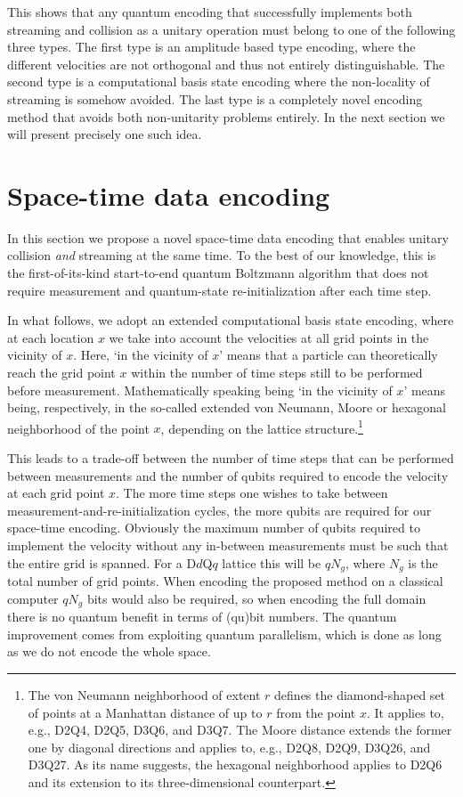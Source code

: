 This shows that any quantum encoding that successfully implements both streaming and collision as a unitary operation must belong to one of the following three types. The first type is an amplitude based type encoding, where the different velocities are not orthogonal and thus not entirely distinguishable. The second type is a computational basis state encoding where the non-locality of streaming is somehow avoided. The last type is a completely novel encoding method that avoids both non-unitarity problems entirely.
In the next section we will present precisely one such idea.


\section{Space-time data encoding}\label{sec:novel_encoding}
In this section we propose a novel space-time data encoding that enables unitary collision \emph{and} streaming at the same time. To the best of our knowledge, this is the first-of-its-kind start-to-end quantum Boltzmann algorithm that does not require measurement and quantum-state re-initialization after each time step.

In what follows, we adopt an extended computational basis state encoding, where at each location $x$ we take into account the velocities at all grid points in the vicinity of $x$. Here, `in the vicinity of $x$' means that a particle can theoretically reach the grid point $x$ within the number of time steps still to be performed before measurement. Mathematically speaking being `in the vicinity of $x$' means being, respectively, in the so-called extended von Neumann, Moore or hexagonal neighborhood of the point $x$, depending on the lattice structure.\footnote{The von Neumann neighborhood of extent $r$ defines the diamond-shaped set of points at a Manhattan distance of up to $r$ from the point $x$. It applies to, e.g., D2Q4, D2Q5, D3Q6, and D3Q7. The Moore distance extends the former one by diagonal directions and applies to, e.g., D2Q8, D2Q9, D3Q26, and D3Q27. As its name suggests, the hexagonal neighborhood applies to D2Q6 and its extension to its three-dimensional counterpart.} 

This leads to a trade-off between the number of time steps that can be performed between measurements and the number of qubits required to encode the velocity at each grid point $x$. The more time steps one wishes to take between measurement-and-re-initialization cycles, the more qubits are required for our space-time encoding. Obviously the maximum number of qubits required to implement the velocity without any in-between measurements must be such that the entire grid is spanned. For a D$d$Q$q$ lattice this will be $qN_g$, where $N_g$ is the total number of grid points. When encoding the proposed method on a classical computer $qN_g$ bits would also be required, so when encoding the full domain there is no quantum benefit in terms of (qu)bit numbers. The quantum improvement comes from exploiting quantum parallelism, which is done as long as we do not encode the whole space.


